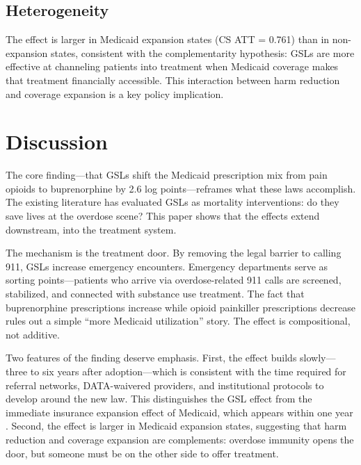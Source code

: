 \documentclass[12pt]{article}
\begin{document}
\subsection{Heterogeneity}

The effect is larger in Medicaid expansion states (CS ATT = 0.761) than in non-expansion states, consistent with the complementarity hypothesis: GSLs are more effective at channeling patients into treatment when Medicaid coverage makes that treatment financially accessible. This interaction between harm reduction and coverage expansion is a key policy implication.

\section{Discussion}

The core finding---that GSLs shift the Medicaid prescription mix from pain opioids to buprenorphine by 2.6 log points---reframes what these laws accomplish. The existing literature has evaluated GSLs as mortality interventions: do they save lives at the overdose scene? This paper shows that the effects extend downstream, into the treatment system.

The mechanism is the treatment door. By removing the legal barrier to calling 911, GSLs increase emergency encounters. Emergency departments serve as sorting points---patients who arrive via overdose-related 911 calls are screened, stabilized, and connected with substance use treatment. The fact that buprenorphine prescriptions increase while opioid painkiller prescriptions decrease rules out a simple ``more Medicaid utilization'' story. The effect is compositional, not additive.

Two features of the finding deserve emphasis. First, the effect builds slowly---three to six years after adoption---which is consistent with the time required for referral networks, DATA-waivered providers, and institutional protocols to develop around the new law. This distinguishes the GSL effect from the immediate insurance expansion effect of Medicaid, which appears within one year \citep{wen2017}. Second, the effect is larger in Medicaid expansion states, suggesting that harm reduction and coverage expansion are complements: overdose immunity opens the door, but someone must be on the other side to offer treatment.
\end{document}
